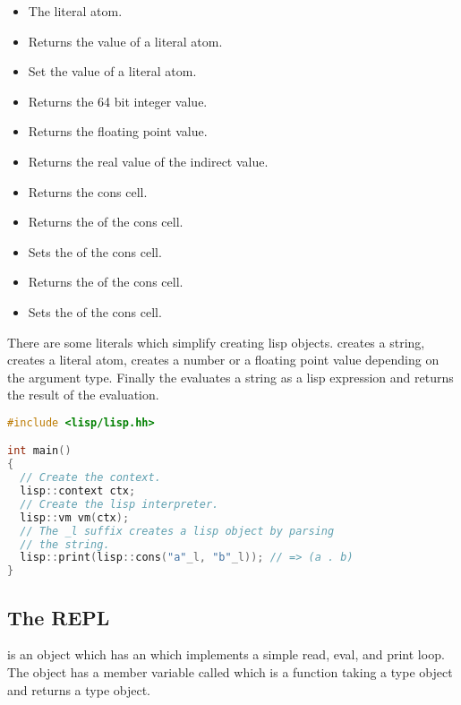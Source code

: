 \begin{itemize}
  \item {} The literal atom.
  \item {} Returns the value of a literal
    atom.
  \item {} Set the value of a literal atom.
  \item {} Returns the 64 bit
    integer value.
  \item {} Returns the floating
    point value.
  \item {} Returns the real
    value of the indirect value.
  \item {} Returns the cons
    cell.
  \item {} Returns the  of
    the cons cell.
  \item {} Sets the  of the cons cell.
  \item {} Returns the  of
    the cons cell.
  \item {} Sets the  of the cons cell.
\end{itemize}

There are some literals which simplify creating lisp
objects.  creates a string, 
creates a literal atom,  creates a number or a
floating point value depending on the argument type. Finally the
 evaluates a string as a lisp expression and returns
the result of the evaluation.

\begin{lstlisting}[language=c++]
#include <lisp/lisp.hh>

int main()
{
  // Create the context.
  lisp::context ctx;
  // Create the lisp interpreter.
  lisp::vm vm(ctx);
  // The _l suffix creates a lisp object by parsing
  // the string.
  lisp::print(lisp::cons("a"_l, "b"_l)); // => (a . b)
}
\end{lstlisting}
\subsection{The REPL}
 is an object which has an  which implements a simple read, eval, and print
loop.  The  object has a member variable called
 which is a function taking a  type object and
returns a  type object.

